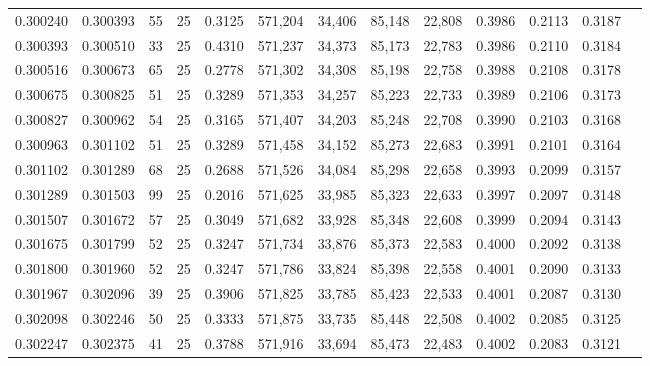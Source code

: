 \begin{tabular}{rrrrrrrrrrrrr}
0.300240 & 0.300393 &    55 &  25 &                                     0.3125 & 571,204 &  34,406 &  85,148 &  22,808 & 0.3986 & 0.2113 & 0.3187 \\
0.300393 & 0.300510 &    33 &  25 &                                     0.4310 & 571,237 &  34,373 &  85,173 &  22,783 & 0.3986 & 0.2110 & 0.3184 \\
0.300516 & 0.300673 &    65 &  25 &                                     0.2778 & 571,302 &  34,308 &  85,198 &  22,758 & 0.3988 & 0.2108 & 0.3178 \\
0.300675 & 0.300825 &    51 &  25 &                                     0.3289 & 571,353 &  34,257 &  85,223 &  22,733 & 0.3989 & 0.2106 & 0.3173 \\
0.300827 & 0.300962 &    54 &  25 &                                     0.3165 & 571,407 &  34,203 &  85,248 &  22,708 & 0.3990 & 0.2103 & 0.3168 \\
0.300963 & 0.301102 &    51 &  25 &                                     0.3289 & 571,458 &  34,152 &  85,273 &  22,683 & 0.3991 & 0.2101 & 0.3164 \\
0.301102 & 0.301289 &    68 &  25 &                                     0.2688 & 571,526 &  34,084 &  85,298 &  22,658 & 0.3993 & 0.2099 & 0.3157 \\
0.301289 & 0.301503 &    99 &  25 &                                     0.2016 & 571,625 &  33,985 &  85,323 &  22,633 & 0.3997 & 0.2097 & 0.3148 \\
0.301507 & 0.301672 &    57 &  25 &                                     0.3049 & 571,682 &  33,928 &  85,348 &  22,608 & 0.3999 & 0.2094 & 0.3143 \\
0.301675 & 0.301799 &    52 &  25 &                                     0.3247 & 571,734 &  33,876 &  85,373 &  22,583 & 0.4000 & 0.2092 & 0.3138 \\
0.301800 & 0.301960 &    52 &  25 &                                     0.3247 & 571,786 &  33,824 &  85,398 &  22,558 & 0.4001 & 0.2090 & 0.3133 \\
0.301967 & 0.302096 &    39 &  25 &                                     0.3906 & 571,825 &  33,785 &  85,423 &  22,533 & 0.4001 & 0.2087 & 0.3130 \\
0.302098 & 0.302246 &    50 &  25 &                                     0.3333 & 571,875 &  33,735 &  85,448 &  22,508 & 0.4002 & 0.2085 & 0.3125 \\
0.302247 & 0.302375 &    41 &  25 &                                     0.3788 & 571,916 &  33,694 &  85,473 &  22,483 & 0.4002 & 0.2083 & 0.3121 \\

\end{tabular}
